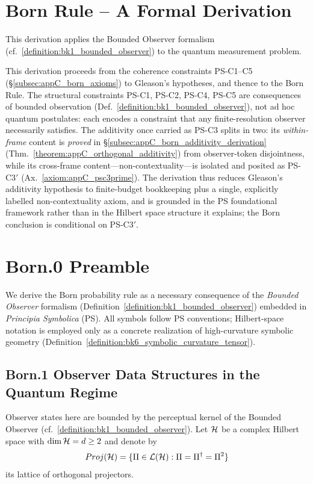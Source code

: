 \section{Born Rule – A Formal Derivation}
\label{sec:appC_born_rule}
This derivation applies the Bounded Observer formalism (cf.~\ref{definition:bk1_bounded_observer}) to the quantum measurement problem.

\begin{remark}
\label{remark:appC_born_rule_dependency}
This derivation proceeds from the coherence constraints PS-C1--C5
(\S\ref{subsec:appC_born_axioms}) to Gleason's hypotheses, and thence to
the Born Rule. The structural constraints PS-C1, PS-C2, PS-C4, PS-C5 are
consequences of bounded observation (Def.~\ref{definition:bk1_bounded_observer}),
not ad hoc quantum postulates: each encodes a constraint that any
finite-resolution observer necessarily satisfies. The additivity once carried as
PS-C3 splits in two: its \emph{within-frame} content is \emph{proved} in
\S\ref{subsec:appC_born_additivity_derivation}
(Thm.~\ref{theorem:appC_orthogonal_additivity}) from observer-token disjointness,
while its cross-frame content---non-contextuality---is isolated and posited as
PS-C3$'$ (Ax.~\ref{axiom:appC_psc3prime}). The derivation thus reduces Gleason's
additivity hypothesis to finite-budget bookkeeping plus a single, explicitly
labelled non-contextuality axiom, and is grounded in the PS foundational framework
rather than in the Hilbert space structure it explains; the Born conclusion is
conditional on PS-C3$'$.
\end{remark}

\section*{Born.0 Preamble}
\label{sec:appC_born_preamble}
We derive the Born probability rule as a necessary consequence of the
\emph{Bounded Observer} formalism (Definition~\ref{definition:bk1_bounded_observer})
embedded in \textit{Principia Symbolica} (PS).
All symbols follow PS conventions; Hilbert-space notation is employed
only as a concrete realization of high-curvature symbolic geometry
(Definition~\ref{definition:bk6_symbolic_curvature_tensor}).

\subsection{Born.1 Observer Data Structures in the Quantum Regime}
\label{subsec:appC_born_observer_structures}
Observer states here are bounded by the perceptual kernel of the Bounded Observer (cf.~\ref{definition:bk1_bounded_observer}).
Let $\mathcal{H}$ be a complex Hilbert space with $\dim\mathcal{H} = d \ge 2$
and denote by
\[
Proj(\mathcal{H}) = \{\Pi\in\mathcal{L}(\mathcal{H}): \Pi = \Pi^\dagger = \Pi^2\}
\]
its lattice of orthogonal projectors.

